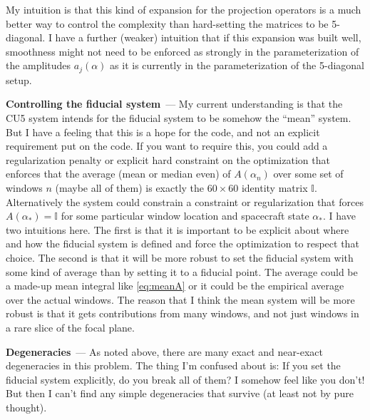 \documentclass[11pt]{article}
\renewcommand{\paragraph}[1]{\medskip\par\noindent\textbf{#1}~---}
\begin{document}
My intuition is that this kind of expansion for the projection operators is a much better way to control the complexity than hard-setting the matrices to be 5-diagonal.
I have a further (weaker) intuition that if this expansion was built well, smoothness might not need to be enforced as strongly in the parameterization of the amplitudes $a_j(\alpha)$ as it is currently in the parameterization of the 5-diagonal setup.

\paragraph{Controlling the fiducial system}
My current understanding is that the CU5 system intends for the fiducial system to be somehow the ``mean'' system.
But I have a feeling that this is a hope for the code, and not an explicit requirement put on the code.
If you want to require this, you could add a regularization penalty or explicit hard constraint on the optimization that enforces that the average (mean or median even) of $A(\alpha_n)$ over some set of windows $n$ (maybe all of them) is exactly the $60\times 60$ identity matrix $\mathbb{I}$.
Alternatively the system could constrain a constraint or regularization that forces $A(\alpha_\ast)=\mathbb{I}$ for some particular window location and spacecraft state $\alpha_\ast$.
I have two intuitions here.
The first is that it is important to be explicit about where and how the fiducial system is defined and force the optimization to respect that choice.
The second is that it will be more robust to set the fiducial system with some kind of average than by setting it to a fiducial point.
The average could be a made-up mean integral like \eqref{eq:meanA} or it could be the empirical average over the actual windows.
The reason that I think the mean system will be more robust is that it gets contributions from many windows, and not just windows in a rare slice of the focal plane.

\paragraph{Degeneracies}
As noted above, there are many exact and near-exact degeneracies in this problem.
The thing I'm confused about is: If you set the fiducial system explicitly, do you break all of them?
I somehow feel like you don't!
But then I can't find any simple degeneracies that survive (at least not by pure thought).
\end{document}
